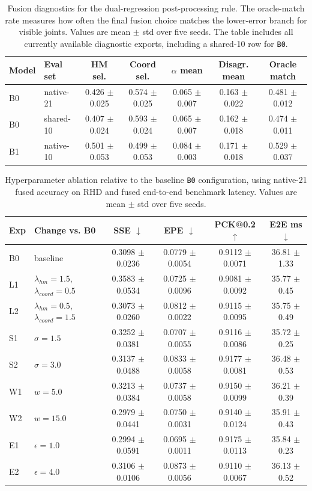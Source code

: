 \documentclass[10pt,letterpaper]{article}
\begin{document}
\begin{table}[H]
\centering
\footnotesize
\caption{Fusion diagnostics for the dual-regression post-processing rule. The oracle-match rate measures how often the final fusion choice matches the lower-error branch for visible joints. Values are mean $\pm$ std over five seeds. The table includes all currently available diagnostic exports, including a shared-10 row for \texttt{B0}.}
\label{tab:fusion_diagnostics}
\begin{tabular}{llccccc}
\toprule
Model & Eval set & HM sel. & Coord sel. & $\alpha$ mean & Disagr. mean & Oracle match \\
\midrule
B0 & native-21 & 0.426 $\pm$ 0.025 & 0.574 $\pm$ 0.025 & 0.065 $\pm$ 0.007 & 0.163 $\pm$ 0.022 & 0.481 $\pm$ 0.012 \\
B0 & shared-10 & 0.407 $\pm$ 0.024 & 0.593 $\pm$ 0.024 & 0.065 $\pm$ 0.007 & 0.162 $\pm$ 0.018 & 0.474 $\pm$ 0.011 \\
B1 & native-10 & 0.501 $\pm$ 0.053 & 0.499 $\pm$ 0.053 & 0.084 $\pm$ 0.003 & 0.171 $\pm$ 0.018 & 0.529 $\pm$ 0.037 \\
\bottomrule
\end{tabular}
\end{table}

\begin{table}[H]
\centering
\footnotesize
\caption{Hyperparameter ablation relative to the baseline \texttt{B0} configuration, using native-21 fused accuracy on RHD and fused end-to-end benchmark latency. Values are mean $\pm$ std over five seeds.}
\label{tab:hyper_ablation}
\begin{tabular}{llcccc}
\toprule
Exp & Change vs. B0 & SSE $\downarrow$ & EPE $\downarrow$ & PCK@0.2 $\uparrow$ & E2E ms $\downarrow$ \\
\midrule
B0 & baseline & 0.3098 $\pm$ 0.0236 & 0.0779 $\pm$ 0.0054 & 0.9112 $\pm$ 0.0071 & 36.81 $\pm$ 1.33 \\
L1 & $\lambda_{hm}=1.5$, $\lambda_{coord}=0.5$ & 0.3583 $\pm$ 0.0534 & 0.0725 $\pm$ 0.0096 & 0.9081 $\pm$ 0.0092 & 35.77 $\pm$ 0.45 \\
L2 & $\lambda_{hm}=0.5$, $\lambda_{coord}=1.5$ & 0.3073 $\pm$ 0.0260 & 0.0812 $\pm$ 0.0022 & 0.9115 $\pm$ 0.0095 & 35.75 $\pm$ 0.49 \\
S1 & $\sigma=1.5$ & 0.3252 $\pm$ 0.0381 & 0.0707 $\pm$ 0.0055 & 0.9116 $\pm$ 0.0086 & 35.72 $\pm$ 0.25 \\
S2 & $\sigma=3.0$ & 0.3137 $\pm$ 0.0488 & 0.0833 $\pm$ 0.0058 & 0.9177 $\pm$ 0.0081 & 36.48 $\pm$ 0.53 \\
W1 & $w=5.0$ & 0.3213 $\pm$ 0.0384 & 0.0737 $\pm$ 0.0058 & 0.9150 $\pm$ 0.0099 & 36.21 $\pm$ 0.39 \\
W2 & $w=15.0$ & 0.2979 $\pm$ 0.0441 & 0.0750 $\pm$ 0.0031 & 0.9140 $\pm$ 0.0124 & 35.91 $\pm$ 0.43 \\
E1 & $\epsilon=1.0$ & 0.2994 $\pm$ 0.0591 & 0.0695 $\pm$ 0.0011 & 0.9175 $\pm$ 0.0113 & 35.84 $\pm$ 0.23 \\
E2 & $\epsilon=4.0$ & 0.3106 $\pm$ 0.0106 & 0.0873 $\pm$ 0.0056 & 0.9110 $\pm$ 0.0067 & 36.13 $\pm$ 0.52 \\
\bottomrule
\end{tabular}
\end{table}
\end{document}
